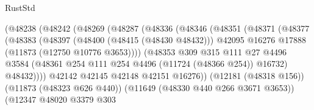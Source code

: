 \begin{lexlean}{RustStd}
\begin{coremodule}
                                    (@48238
                                      (@48242
                                        (@48269
                                          (@48287
                                            (@48336
                                              (@48346
                                                (@48351
                                                  (@48371
                                                    (@48377
                                                      (@48383
                                                        (@48397
                                                          (@48400 (@48415 (@48430 @48432)))
                                                          @42095
                                                          @16276
                                                          @17888
                                                          (@11873 (@12750 @10776 @3653))))
                                                      (@48353
                                                        @309
                                                        @315
                                                        @111
                                                        @27
                                                        @4496
                                                        @3584
                                                        (@48361
                                                          @254
                                                          @111
                                                          @254
                                                          @4496
                                                          (@11724 (@48366 @254))
                                                          @16732)
                                                        @48432))))
                                                @42142
                                                @42145
                                                @42148
                                                @42151
                                                @16276))
                                            (@12181 (@48318 @156))
                                            (@11873 (@48323 @626 @440))
                                            (@11649 (@48330 @440 @266 @3671 @3653))
                                            (@12347
                                              @48020
                                              @3379
                                              @303

\end{coremodule}
\end{lexlean}
